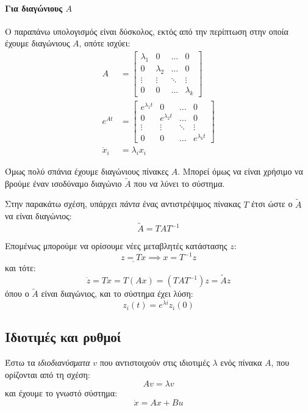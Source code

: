 \documentclass[11pt,a4paper,notitlepage,fleqn]{article}
\begin{document}
\paragraph{Για διαγώνιους \(A\)}
Ο παραπάνω υπολογισμός είναι δύσκολος, εκτός από την περίπτωση στην οποία έχουμε διαγώνιους \( A \), οπότε ισχύει:
\begin{align*}
	A &= \left[\begin{matrix}
	\lambda_1 & 0 & \hdots & 0 \\
	0 & \lambda_2 & \hdots & 0 \\
	\vdots & \vdots & \ddots & \vdots \\
	0 & 0 & \hdots & \lambda_k
	\end{matrix}\right] \\
	e^{At} &= \left[\begin{matrix}
	e^{\lambda_1t} & 0 & \hdots & 0 \\
	0 & e^{\lambda_2t} & \hdots & 0 \\
	\vdots & \vdots & \ddots & \vdots \\
	0 & 0 & \hdots & e^{\lambda_kt}
	\end{matrix}\right]\\
	\dot x_i &= \lambda_i x_i
\end{align*}

Όμως πολύ σπάνια έχουμε διαγώνιους πίνακες \( A \). Μπορεί όμως να είναι χρήσιμο να βρούμε έναν ισοδύναμο διαγώνιο \( \tilde A \)
που να λύνει το σύστημα.

Στην παρακάτω σχέση, υπάρχει \textit{πάντα} ένας αντιστρέψιμος πίνακας \( T \) έτσι ώστε ο \( \tilde A \) να είναι διαγώνιος:
\[
\tilde A = TAT^{-1}
\]

Επομένως μπορούμε να ορίσουμε νέες μεταβλητές κατάστασης \( z \):
\[
\underline{z = Tx} \implies x = T^{-1}z
\]
και τότε:
\[
\dot z = T\dot x = T(Ax) = \left(TAT^{-1}\right)z = \tilde Az
\]
όπου ο \( \tilde A \) είναι διαγώνιος, και το σύστημα έχει λύση:
\[
z_i(t) = e^{\lambda i} z_i (0)
\]


\subsection{Ιδιοτιμές και ρυθμοί}
Έστω τα \textit{ιδιοδιανύσματα} \( v \) που αντιστοιχούν στις
ιδιοτιμές \( λ \) ενός πίνακα \( A \), που ορίζονται από τη σχέση:
\[
Av = λv
\]
και έχουμε το γνωστό σύστημα:
\[
\dot x = Ax + Bu
\]
\end{document}
